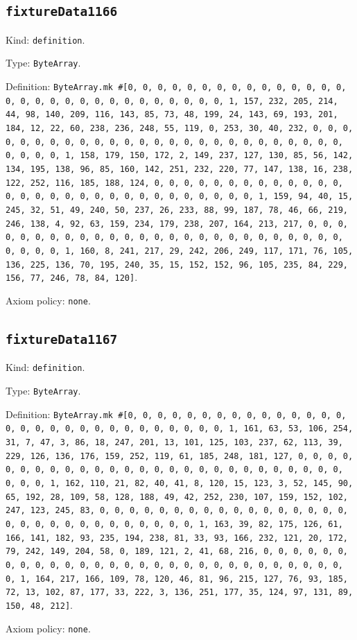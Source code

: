 \documentclass[11pt]{article}
\begin{document}
\subsection*{\texttt{fixtureData1166}}
\noindent Kind: \texttt{definition}.\par
\noindent Type: \texttt{ByteArray}.\par
\noindent Definition: \texttt{ByteArray.mk \#[0, 0, 0, 0, 0, 0, 0, 0, 0, 0, 0, 0, 0, 0, 0, 0, 0, 0, 0, 0, 0, 0, 0, 0, 0, 0, 0, 0, 0, 0, 1, 157, 232, 205, 214, 44, 98, 140, 209, 116, 143, 85, 73, 48, 199, 24, 143, 69, 193, 201, 184, 12, 22, 60, 238, 236, 248, 55, 119, 0, 253, 30, 40, 232, 0, 0, 0, 0, 0, 0, 0, 0, 0, 0, 0, 0, 0, 0, 0, 0, 0, 0, 0, 0, 0, 0, 0, 0, 0, 0, 0, 0, 0, 0, 1, 158, 179, 150, 172, 2, 149, 237, 127, 130, 85, 56, 142, 134, 195, 138, 96, 85, 160, 142, 251, 232, 220, 77, 147, 138, 16, 238, 122, 252, 116, 185, 188, 124, 0, 0, 0, 0, 0, 0, 0, 0, 0, 0, 0, 0, 0, 0, 0, 0, 0, 0, 0, 0, 0, 0, 0, 0, 0, 0, 0, 0, 0, 0, 1, 159, 94, 40, 15, 245, 32, 51, 49, 240, 50, 237, 26, 233, 88, 99, 187, 78, 46, 66, 219, 246, 138, 4, 92, 63, 159, 234, 179, 238, 207, 164, 213, 217, 0, 0, 0, 0, 0, 0, 0, 0, 0, 0, 0, 0, 0, 0, 0, 0, 0, 0, 0, 0, 0, 0, 0, 0, 0, 0, 0, 0, 0, 0, 1, 160, 8, 241, 217, 29, 242, 206, 249, 117, 171, 76, 105, 136, 225, 136, 70, 195, 240, 35, 15, 152, 152, 96, 105, 235, 84, 229, 156, 77, 246, 78, 84, 120]}.\par
\noindent Axiom policy: \texttt{none}.\par
\subsection*{\texttt{fixtureData1167}}
\noindent Kind: \texttt{definition}.\par
\noindent Type: \texttt{ByteArray}.\par
\noindent Definition: \texttt{ByteArray.mk \#[0, 0, 0, 0, 0, 0, 0, 0, 0, 0, 0, 0, 0, 0, 0, 0, 0, 0, 0, 0, 0, 0, 0, 0, 0, 0, 0, 0, 0, 0, 1, 161, 63, 53, 106, 254, 31, 7, 47, 3, 86, 18, 247, 201, 13, 101, 125, 103, 237, 62, 113, 39, 229, 126, 136, 176, 159, 252, 119, 61, 185, 248, 181, 127, 0, 0, 0, 0, 0, 0, 0, 0, 0, 0, 0, 0, 0, 0, 0, 0, 0, 0, 0, 0, 0, 0, 0, 0, 0, 0, 0, 0, 0, 0, 1, 162, 110, 21, 82, 40, 41, 8, 120, 15, 123, 3, 52, 145, 90, 65, 192, 28, 109, 58, 128, 188, 49, 42, 252, 230, 107, 159, 152, 102, 247, 123, 245, 83, 0, 0, 0, 0, 0, 0, 0, 0, 0, 0, 0, 0, 0, 0, 0, 0, 0, 0, 0, 0, 0, 0, 0, 0, 0, 0, 0, 0, 0, 0, 1, 163, 39, 82, 175, 126, 61, 166, 141, 182, 93, 235, 194, 238, 81, 33, 93, 166, 232, 121, 20, 172, 79, 242, 149, 204, 58, 0, 189, 121, 2, 41, 68, 216, 0, 0, 0, 0, 0, 0, 0, 0, 0, 0, 0, 0, 0, 0, 0, 0, 0, 0, 0, 0, 0, 0, 0, 0, 0, 0, 0, 0, 0, 0, 1, 164, 217, 166, 109, 78, 120, 46, 81, 96, 215, 127, 76, 93, 185, 72, 13, 102, 87, 177, 33, 222, 3, 136, 251, 177, 35, 124, 97, 131, 89, 150, 48, 212]}.\par
\noindent Axiom policy: \texttt{none}.\par
\end{document}

